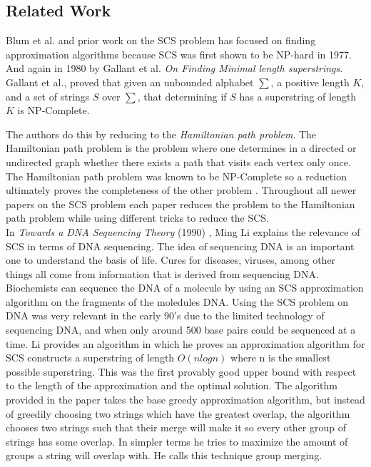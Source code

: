 \documentclass[letterpaper,11pt,titlepage]{article}
\begin{document}
\newpage
\subsection*{Related Work}

Blum et al. and prior work on the SCS problem has focused on finding approximation algorithms because SCS was first shown to be NP-hard in 1977. And again in 1980 by Gallant et al. \textit{On Finding Minimal length superstrings}\cite{gallant1980finding}.  Gallant et al., proved that given an unbounded alphabet $\sum$, a positive length $K$, and a set of strings $S$ over $\sum$, that determining if $S$ has a superstring of length $K$ is NP-Complete.


 The authors do this by reducing to the \textit{Hamiltonian  path problem}. The Hamiltonian path problem is the problem where one determines in a directed or undirected graph whether there exists a path that visits each vertex only once. The Hamiltonian path problem was known to be NP-Complete so a reduction ultimately proves the completeness of the other problem \cite{michael1979computers}. Throughout all newer papers on the SCS problem each paper reduces the problem to the Hamiltonian path problem while using different tricks to reduce the SCS.\\

In \textit{Towards a DNA Sequencing Theory} (1990) \cite{li1990towards}, Ming Li explains the relevance of SCS in terms of DNA sequencing. The idea of sequencing DNA is an important one to understand the basis of life. Cures for diseases, viruses, among other things all come from information that is derived from sequencing DNA.  Biochemists can sequence the DNA of a molecule by using an SCS approximation algorithm on the fragments of the moledules DNA.  Using the SCS problem on DNA was very relevant in the early 90's due to the limited technology of sequencing DNA, and when only around 500 base pairs could be sequenced at a time. Li provides an algorithm in which he proves an approximation algorithm for SCS constructs a superstring of length $O(nlogn)$ where n is the smallest possible superstring. This was the first provably good upper bound with respect to the length of the approximation and the optimal solution.  The algorithm provided in the paper takes the base greedy approximation algorithm, but instead of greedily choosing two strings which have the greatest overlap, the algorithm chooses two strings such that their merge will make it so every other group of strings has some overlap. In simpler terms he tries to maximize the amount of groups a string will overlap with. He calls this technique group merging.
\end{document}
